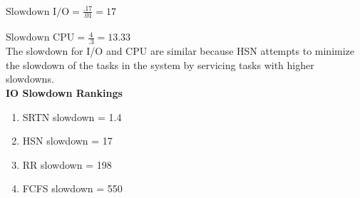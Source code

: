\documentclass{article}
\theoremstyle{problemstyle}
\begin{document}
$\text{Slowdown I/O} = \frac{.17}{.01} = 17$\\\\
$\text{Slowdown CPU} = \frac{4}{.3} = 13.33$\\

The slowdown for I/O and CPU are similar because HSN attempts to minimize the slowdown of the tasks in the system by servicing tasks with higher slowdowns.\\

\textbf{IO Slowdown Rankings}
\begin{enumerate}
	\item SRTN slowdown = 1.4
	\item HSN slowdown = 17
	\item RR slowdown = 198
	\item FCFS slowdown = 550	
\end{enumerate}
\end{document}
